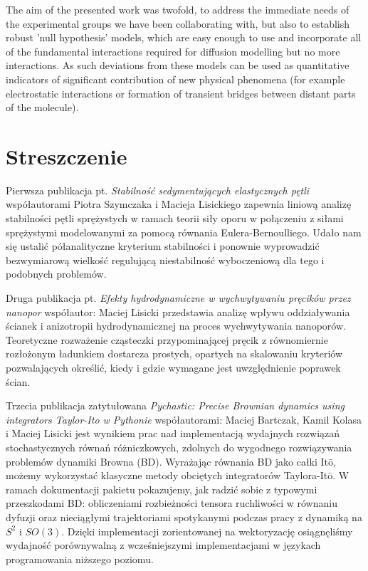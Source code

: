 \documentclass{doctoral}
\newcommand{\code}[1]{\texttt{\detokenize{#1}}}
\newcommand{\grayout}[1]{{\leavevmode\color{gray}#1}}
\begin{document}
The aim of the presented work was twofold, to address the immediate needs of the experimental groups we have been collaborating with, but also to establish robust 'null hypothesis' models, which are easy enough to use and incorporate all of the fundamental interactions required for diffusion modelling but no more interactions.
As such deviations from these models can be used as quantitative indicators of significant contribution of new physical phenomena (for example electrostatic interactions or formation of transient bridges between distant parts of the molecule).
\clearpage

\section*{Streszczenie}
\grayout{Pierwsza publikacja pt. \emph{Stabilność sedymentujących elastycznych pętli}
    współautorami Piotra Szymczaka i Macieja Lisickiego
    zapewnia liniową analizę stabilności pętli sprężystych w ramach teorii siły oporu w połączeniu z siłami sprężystymi modelowanymi za pomocą równania Eulera-Bernoulliego.
    Udało nam się ustalić półanalityczne kryterium stabilności i ponownie wyprowadzić bezwymiarową wielkość regulującą niestabilność wyboczeniową dla tego i podobnych problemów.

    Druga publikacja pt.
    \emph{Efekty hydrodynamiczne w wychwytywaniu pręcików przez nanopor}
    współautor: Maciej Lisicki
    przedstawia analizę wpływu oddziaływania ścianek i anizotropii hydrodynamicznej na proces wychwytywania nanoporów.
    Teoretyczne rozważenie cząsteczki przypominającej pręcik z równomiernie rozłożonym ładunkiem dostarcza prostych, opartych na skalowaniu kryteriów pozwalających określić, kiedy i gdzie wymagane jest uwzględnienie poprawek ścian.

    Trzecia publikacja zatytułowana \emph{Pychastic: Precise Brownian dynamics using integrators Taylor-Ito w Pythonie} współautorami: Maciej Bartczak, Kamil Kolasa i Maciej Lisicki jest wynikiem prac nad implementacją wydajnych rozwiązań stochastycznych równań różniczkowych, zdolnych do wygodnego rozwiązywania problemów dynamiki Browna (BD).
    Wyrażając równania BD jako całki Itō, możemy wykorzystać klasyczne metody obciętych integratorów Taylora-Itō.
    W ramach dokumentacji pakietu \code{pychastic} pokazujemy, jak radzić sobie z typowymi przeszkodami BD: obliczeniami rozbieżności tensora ruchliwości w równaniu dyfuzji oraz nieciągłymi trajektoriami spotykanymi podczas pracy z dynamiką na $S^2$ i $SO(3)$.
    Dzięki implementacji zorientowanej na wektoryzację osiągnęliśmy wydajność porównywalną z wcześniejszymi implementacjami w językach programowania niższego poziomu.

}
\end{document}
